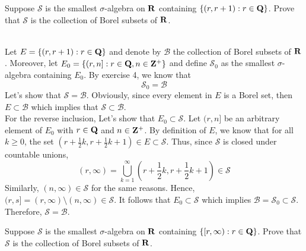 \begin{exercise}
    Suppose $\mathcal{S}$ is the smallest $\sigma$-algebra on $\mathbf{R}$ containing $\{(r, r+1):r\in\mathbf{Q}\}$. Prove that $\mathcal{S}$ is the collection of Borel subsets of $\mathbf{R}$. \\
\end{exercise}

\begin{solution}
    \\ Let $E = \{(r, r+1):r\in\mathbf{Q}\}$ and denote by $\mathcal{B}$ the collection of Borel subsets of $\mathbf{R}$. Moreover, let $E_0 = \{(r, n]:r\in\mathbf{Q}, n\in\mathbf{Z}^+\}$ and define $\mathcal{S}_0$ as the smallest $\sigma$-algebra containing $E_0$. By exercise 4, we know that
    $$\mathcal{S}_0 = \mathcal{B}$$
    Let's show that $\mathcal{S} = \mathcal{B}$. Obviously, since every element in $E$ is a Borel set, then $E \subset \mathcal{B}$ which implies that $\mathcal{S} \subset \mathcal{B}$. \\
    For the reverse inclusion, Let's show that $E_0 \subset \mathcal{S}$. Let $(r, n]$ be an arbitrary element of $E_0$ with $r \in \mathbf{Q}$ and $n \in \mathbf{Z}^+$. By definition of $E$, we know that for all $k \geq 0$, the set $(r + \frac{1}{2}k, r + \frac{1}{2}k + 1) \in E \subset \mathcal{S}$. Thus, since $\mathcal{S}$ is closed under countable unions,
    $$(r, \infty) = \bigcup_{k=1}^{\infty}\left(r + \frac{1}{2}k, r + \frac{1}{2}k + 1\right) \in \mathcal{S}$$
    Similarly, $(n, \infty) \in \mathcal{S}$ for the same reasons. Hence, $(r,s] = (r, \infty) \setminus (n, \infty) \in \mathcal{S}$. It follows that $E_0 \subset \mathcal{S}$ which implies $\mathcal{B} = \mathcal{S}_0 \subset \mathcal{S}$. Therefore, $\mathcal{S} = \mathcal{B}$.\\
\end{solution}

\begin{exercise}
    Suppose $\mathcal{S}$ is the smallest $\sigma$-algebra on $\mathbf{R}$ containing $\{[r, \infty):r\in\mathbf{Q}\}$. Prove that $\mathcal{S}$ is the collection of Borel subsets of $\mathbf{R}$. \\
\end{exercise}

